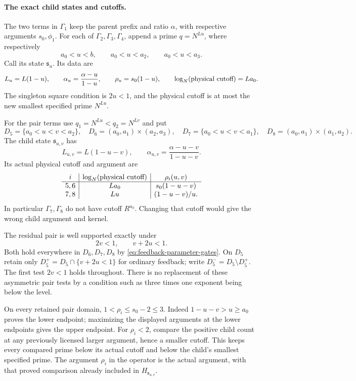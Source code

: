 \paragraph{The exact child states and cutoffs.}
The two terms in $\Gamma_1$ keep the parent prefix and ratio
$\alpha$, with respective arguments $s_0,\phi_1$.
For each of $\Gamma_2,\Gamma_3,\Gamma_4$, append a prime
$q=N^{Lu}$, where respectively
\[
 a_0<u<b,\qquad a_0<u<a_2,\qquad a_0<u<a_3.
\]
Call its state $\mathfrak s_u$.  Its data are
\begin{equation}\label{eq:feedback-single-child}
 L_u=L(1-u),\qquad
 \alpha_u=\frac{\alpha-u}{1-u},\qquad
 \rho_u=s_0(1-u),\qquad
 \log_N(\hbox{physical cutoff})=La_0.
\end{equation}
The singleton square condition is $2u<1$, and the physical cutoff
is at most the new smallest specified prime $N^{Lu}$.

For the pair terms use $q_1=N^{Lu}<q_2=N^{Lv}$ and put
\[
 D_5=\{a_0<u<v<a_2\},\quad
 D_6=(a_0,a_1)\times(a_2,a_3),\quad
 D_7=\{a_0<u<v<a_1\},\quad
 D_8=(a_0,a_1)\times(a_1,a_2).
\]
The child state $\mathfrak s_{u,v}$ has
\begin{equation}\label{eq:feedback-pair-child}
 L_{u,v}=L(1-u-v),\qquad
 \alpha_{u,v}=\frac{\alpha-u-v}{1-u-v}.
\end{equation}
Its actual physical cutoff and argument are
\[
\begin{array}{c|c|c}
 i&\log_N(\hbox{physical cutoff})&\rho_i(u,v)\\\hline
 5,6&La_0&s_0(1-u-v)\\
 7,8&Lu&(1-u-v)/u.
\end{array}
\]
In particular $\Gamma_7,\Gamma_8$ do not have cutoff $R^{a_0}$.
Changing that cutoff would give the wrong child argument and kernel.

The residual pair is well supported exactly under
\begin{equation}\label{eq:feedback-pair-squares}
 2v<1,\qquad v+2u<1.
\end{equation}
Both hold everywhere in $D_6,D_7,D_8$ by
\eqref{eq:feedback-parameter-gates}.  On $D_5$ retain only
$D_5^+=D_5\cap\{v+2u<1\}$ for ordinary feedback; write
$D_5^-=D_5\setminus D_5^+$.  The first test $2v<1$ holds throughout.
There is no replacement of these asymmetric pair tests by a
condition such as three times one exponent being below the level.

On every retained pair domain, $1<\rho_i\le s_0-2\le3$.
Indeed $1-u-v>u\ge a_0$ proves the lower endpoint; maximizing
the displayed arguments at the lower endpoints gives the upper
endpoint.  For $\rho_i<2$, compare the positive child count at
any previously licensed larger argument, hence a smaller cutoff.
This keeps every compared prime below its actual cutoff and below
the child's smallest specified prime.  The argument $\rho_i$ in
the operator is the actual argument, with that proved comparison
already included in $H_{\mathfrak s_{u,v}}$.

